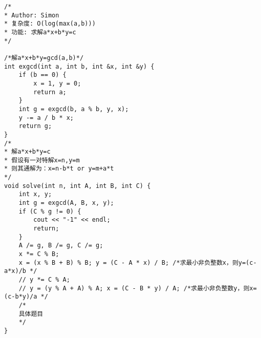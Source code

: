 \begin{lstlisting}
/*
* Author: Simon
* 复杂度: O(log(max(a,b)))
* 功能: 求解a*x+b*y=c
*/

/*解a*x+b*y=gcd(a,b)*/
int exgcd(int a, int b, int &x, int &y) {
	if (b == 0) {
		x = 1, y = 0;
		return a;
	}
	int g = exgcd(b, a % b, y, x);
	y -= a / b * x;
	return g;
}
/*
* 解a*x+b*y=c
* 假设有一对特解x=n,y=m
* 则其通解为：x=n-b*t or y=m+a*t
*/
void solve(int n, int A, int B, int C) {
	int x, y;
	int g = exgcd(A, B, x, y);
	if (C % g != 0) {
		cout << "-1" << endl;
		return;
	}
	A /= g, B /= g, C /= g;
	x *= C % B;
	x = (x % B + B) % B; y = (C - A * x) / B; /*求最小非负整数x，则y=(c-a*x)/b */
	// y *= C % A;
	// y = (y % A + A) % A; x = (C - B * y) / A; /*求最小非负整数y，则x=(c-b*y)/a */
	/*
	具体题目
	*/
}
\end{lstlisting}